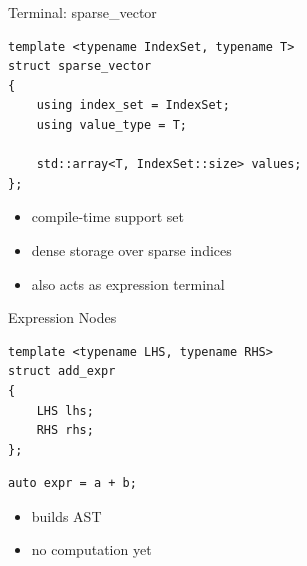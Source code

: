 \documentclass{beamer}
\begin{document}

\begin{frame}[fragile]{Terminal: sparse\_vector}

\begin{lstlisting}
template <typename IndexSet, typename T>
struct sparse_vector
{
    using index_set = IndexSet;
    using value_type = T;

    std::array<T, IndexSet::size> values;
};
\end{lstlisting}

\vspace{1em}

\begin{itemize}
\item compile-time support set
\item dense storage over sparse indices
\item also acts as expression terminal
\end{itemize}

\end{frame}


\begin{frame}[fragile]{Expression Nodes}

\begin{lstlisting}
template <typename LHS, typename RHS>
struct add_expr
{
    LHS lhs;
    RHS rhs;
};
\end{lstlisting}

\vspace{1em}

\begin{lstlisting}
auto expr = a + b;
\end{lstlisting}

\vspace{1em}

\begin{itemize}
\item builds AST
\item no computation yet
\end{itemize}

\end{frame}

\end{document}
